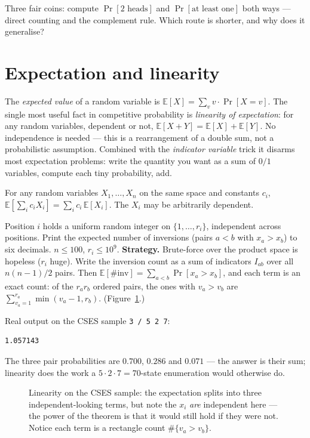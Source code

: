 \begin{exercise}[easy] Three fair coins: compute
$\Pr[\text{2 heads}]$ and $\Pr[\text{at least one}]$ both
ways --- direct counting and the complement rule. Which route
is shorter, and why does it generalise?\end{exercise}

\section{Expectation and linearity}\label{sec:exp}
The \emph{expected value} of a random variable is
$\mathbb{E}[X]=\sum_v v\cdot\Pr[X=v]$. The single most useful fact in
competitive probability is \emph{linearity of expectation}: for
any random variables, dependent or not,
$\mathbb{E}[X+Y]=\mathbb{E}[X]+\mathbb{E}[Y]$. No independence is needed --- this is a
rearrangement of a double sum, not a probabilistic assumption.
Combined with the \emph{indicator variable} trick it disarms
most expectation problems: write the quantity you want as a sum
of $0/1$ variables, compute each tiny probability, add.

\begin{theorem}\label{thm:linexp}
For any random variables $X_1,\dots,X_n$ on the same space and
constants $c_i$, $\mathbb{E}[\sum_i c_i X_i]=\sum_i c_i\,\mathbb{E}[X_i]$.
The $X_i$ may be arbitrarily dependent.
\end{theorem}

\begin{example}
Position $i$ holds a uniform random integer on
$\{1,\dots,r_i\}$, independent across positions. Print the
expected number of inversions (pairs $a<b$ with
$x_a>x_b$) to six decimals. $n\le 100$, $r_i\le 10^9$.
\textbf{Strategy.} Brute-force over the product space is
hopeless ($r_i$ huge). Write the inversion count as a sum of
indicators $I_{ab}$ over all $n(n-1)/2$ pairs. Then
$\mathbb{E}[\#\text{inv}]=\sum_{a<b}\Pr[x_a>x_b]$, and each term is an
exact count: of the $r_a r_b$ ordered pairs, the ones with
$v_a>v_b$ are $\sum_{v_a=1}^{r_a}\min(v_a-1,r_b)$.
(Figure~\ref{fig:indicator}.)
\end{example}
\begin{solution}

Real output on the CSES sample \texttt{3 / 5 2 7}:
\begin{verbatim}
1.057143
\end{verbatim}
The three pair probabilities are $0.700$, $0.286$ and
$0.071$ --- the answer is their sum; linearity does the work a
$5\cdot2\cdot7=70$-state enumeration would otherwise do.
\end{solution}
\begin{figure}[ht]\centering

\caption{Linearity on the CSES sample: the expectation splits
into three independent-looking terms, but note the $x_i$
\emph{are} independent here --- the power of the theorem is that
it would still hold if they were not. Notice each term is a
rectangle count $\#\{v_a>v_b\}$.}
\label{fig:indicator}
\end{figure}

